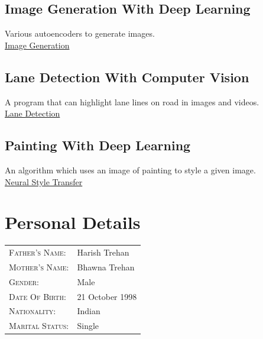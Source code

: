 \documentclass{my_cv}
\begin{document}
	  \subsection{Image Generation With Deep Learning}
	  Various autoencoders to generate images.\\
	  \href{https://github.com/anuj2110/keras}{Image Generation}
	  \subsection{Lane Detection With Computer Vision}
	  A program that can highlight lane lines on road in images and videos.\\
	  \href{https://github.com/anuj2110/LaneDetection}{Lane Detection}
	  \subsection{Painting With Deep Learning}
	  An algorithm which uses an image of painting to style a given image.\\
	  \href{https://github.com/anuj2110/neural-style-transfer
	  }{Neural Style Transfer}
	
    \section{Personal Details}
      
      
    \begin{tabular}{ll}
    	\textsc{Father's Name:} & Harish Trehan \\
    	\textsc{Mother's Name:}       & Bhawna Trehan \\
    	\textsc{Gender:}         & Male \\
    	\textsc{Date Of Birth:}         & 21 October 1998 \\
    	\textsc{Nationality:}   & Indian \\
    	\textsc{Marital Status:} & Single \\
    \end{tabular}
	
\end{document}
